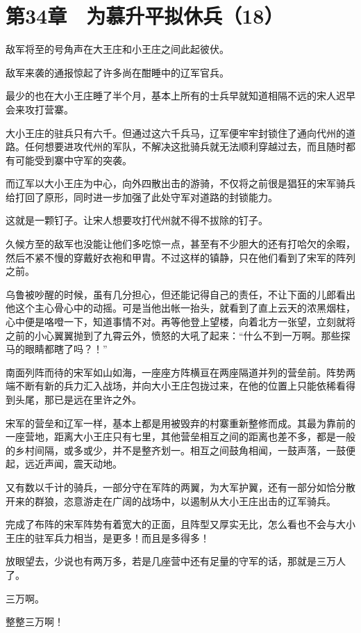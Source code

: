 \section{第34章　为慕升平拟休兵（18）}

敌军将至的号角声在大王庄和小王庄之间此起彼伏。

敌军来袭的通报惊起了许多尚在酣睡中的辽军官兵。

最少的也在大小王庄睡了半个月，基本上所有的士兵早就知道相隔不远的宋人迟早会来攻打营寨。

大小王庄的驻兵只有六千。但通过这六千兵马，辽军便牢牢封锁住了通向代州的道路。任何想要进攻代州的军队，不解决这批骑兵就无法顺利穿越过去，而且随时都有可能受到寨中守军的突袭。

而辽军以大小王庄为中心，向外四散出击的游骑，不仅将之前很是猖狂的宋军骑兵给打回了原形，同时进一步加强了此处守军对道路的封锁能力。

这就是一颗钉子。让宋人想要攻打代州就不得不拔除的钉子。

久候方至的敌军也没能让他们多吃惊一点，甚至有不少胆大的还有打哈欠的余暇，然后不紧不慢的穿戴好衣袍和甲胄。不过这样的镇静，只在他们看到了宋军的阵列之前。

乌鲁被吵醒的时候，虽有几分担心，但还能记得自己的责任，不让下面的儿郎看出他这个主心骨心中的动摇。可是当他出帐一抬头，就看到了直上云天的浓黑烟柱，心中便是咯噔一下，知道事情不对。再等他登上望楼，向着北方一张望，立刻就将之前的小心翼翼抛到了九霄云外，愤怒的大吼了起来：“什么不到一万啊。那些探马的眼睛都瞎了吗？！”

南面列阵而待的宋军如山如海，一座座方阵横亘在两座隔道并列的营垒前。阵势两端不断有新的兵力汇入战场，并向大小王庄包拢过来，在他的位置上只能依稀看得到头尾，那已是远在里许之外。

宋军的营垒和辽军一样，基本上都是用被毁弃的村寨重新整修而成。其最为靠前的一座营地，距离大小王庄只有七里，其他营垒相互之间的距离也差不多，都是一般的乡村间隔，或多或少，并不是整齐划一。相互之间鼓角相闻，一鼓声落，一鼓便起，远近声闻，震天动地。

又有数以千计的骑兵，一部分守在军阵的两翼，为大军护翼，还有一部分如恰分散开来的群狼，恣意游走在广阔的战场中，以遏制从大小王庄出击的辽军骑兵。

完成了布阵的宋军阵势有着宽大的正面，且阵型又厚实无比，怎么看也不会与大小王庄的驻军兵力相当，是更多！而且是多得多！

放眼望去，少说也有两万多，若是几座营中还有足量的守军的话，那就是三万人了。

三万啊。

整整三万啊！

